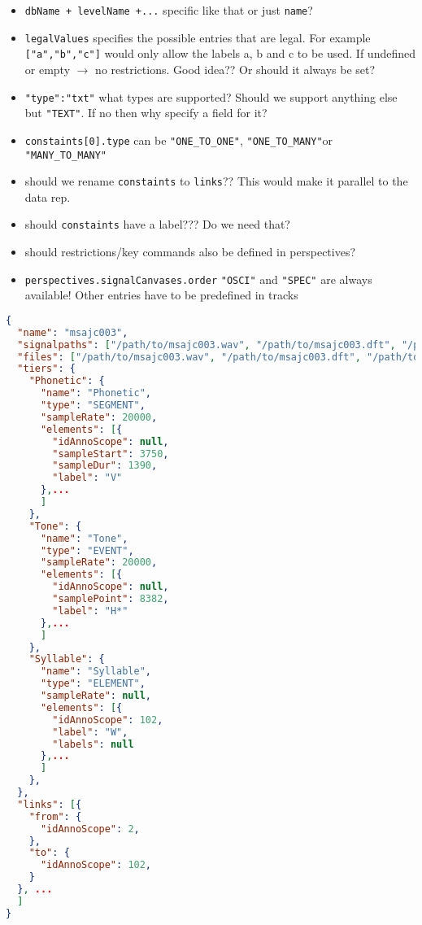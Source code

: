 \documentclass[A4,12pt, utf8]{article}
\begin{document}



\begin{itemize}
  \item \texttt{dbName + levelName +...} specific like that or just \texttt{name}?
  \item \texttt{legalValues} specifies the possible entries that are legal. For example \texttt{["a","b","c"]} would only allow the labels a, b and c to be used. If undefined or empty $\rightarrow$ no restrictions. Good idea?? Or should it always be set?
  \item \texttt{"type":"txt"} what types are supported? Should we support anything else but \texttt{"TEXT"}. If no then why specify a field for it?
  \item \texttt{constaints[0].type} can be \texttt{"ONE\_TO\_ONE"}, \texttt{"ONE\_TO\_MANY"}or \texttt{"MANY\_TO\_MANY"}
  \item should we rename \texttt{constaints} to \texttt{links}?? This would make it parallel to the data rep.
  \item should \texttt{constaints} have a label??? Do we need that?
  \item should restrictions/key commands also be defined in perspectives?
  \item \texttt{perspectives.signalCanvases.order} \texttt{"OSCI"} and \texttt{"SPEC"} are always available! Other entries have to be predefined in tracks 
\end{itemize}


\begin{lstlisting}[caption=New annotation file example, label=ilr, language=json,firstnumber=1]
{
  "name": "msajc003",
  "signalpaths": ["/path/to/msajc003.wav", "/path/to/msajc003.dft", "/path/2/msajc003.fms"],
  "files": ["/path/to/msajc003.wav", "/path/to/msajc003.dft", "/path/to/msajc003.fms"],
  "tiers": {
    "Phonetic": {
      "name": "Phonetic",
      "type": "SEGMENT",
      "sampleRate": 20000,
      "elements": [{
        "idAnnoScope": null,
        "sampleStart": 3750,
        "sampleDur": 1390,
        "label": "V"
      },...
      ]
    },
    "Tone": {
      "name": "Tone",
      "type": "EVENT",
      "sampleRate": 20000,
      "elements": [{
        "idAnnoScope": null,
        "samplePoint": 8382,
        "label": "H*"
      },...
      ]
    },
    "Syllable": {
      "name": "Syllable",
      "type": "ELEMENT",
      "sampleRate": null,
      "elements": [{
        "idAnnoScope": 102,
        "label": "W",
        "labels": null
      },...
      ]
    },
  },
  "links": [{
    "from": {
      "idAnnoScope": 2,
    },
    "to": {
      "idAnnoScope": 102,
    }
  }, ...
  ]
}
\end{lstlisting}
\end{document}
